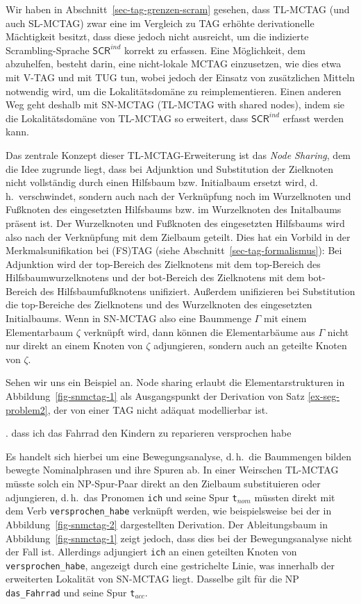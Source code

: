 Wir haben in Abschnitt~\ref{sec-tag-grenzen-scram} gesehen, dass TL-MCTAG (und auch SL-MCTAG) zwar eine im Vergleich zu TAG erhöhte derivationelle Mächtigkeit besitzt, dass diese jedoch nicht ausreicht, um die indizierte Scrambling-Sprache  $\mathsf{SCR}^{ind}$ korrekt zu erfassen. Eine Möglichkeit, dem abzuhelfen, besteht darin, eine nicht-lokale MCTAG einzusetzen, wie dies etwa \cite{Rambow:94} mit V-TAG und \cite{Gerdes:04} mit TUG tun, wobei jedoch der Einsatz von zusätzlichen Mitteln notwendig wird, um die Lokalitätsdomäne zu reimplementieren. Einen anderen Weg geht deshalb \cite{Kallmeyer:05} mit SN-MCTAG (TL-MCTAG with shared nodes), indem sie die Lokalitätsdomäne von TL-MCTAG so erweitert, dass $\mathsf{SCR}^{ind}$ erfasst werden kann. 

Das zentrale Konzept dieser TL-MCTAG-Erweiterung ist das {\it Node Sharing}, dem die Idee zugrunde liegt, dass bei Adjunktion und Substitution der Zielknoten nicht vollständig durch einen Hilfsbaum bzw. Initialbaum ersetzt wird, d.\,h.\ verschwindet, sondern auch nach der Verknüpfung noch im Wurzelknoten und Fu\ss knoten des eingesetzten Hilfsbaums bzw. im Wurzelknoten des Initalbaums präsent ist. Der Wurzelknoten und Fu\ss knoten des eingesetzten Hilfsbaums wird also nach der Verknüpfung mit dem Zielbaum geteilt. Dies hat ein Vorbild in der Merkmalsunifikation bei (FS)TAG (siehe Abschnitt~\ref{sec-tag-formalismus}): Bei Adjunktion wird der {\sc top}-Bereich des Zielknotens mit dem {\sc top}-Bereich des Hilfsbaumwurzelknotens und der {\sc bot}-Bereich des Zielknotens mit dem {\sc bot}-Bereich des Hilfsbaumfu\ss knotens unifiziert. Au\ss erdem unifizieren bei Substitution die {\sc top}-Bereiche des Zielknotens und des Wurzelknoten des eingesetzten Initialbaums. Wenn in SN-MCTAG also eine Baummenge $\Gamma$ mit einem Elementarbaum $\zeta$ verknüpft wird, dann können die Elementarbäume aus $\Gamma$ nicht nur direkt an einem Knoten von $\zeta$ adjungieren, sondern auch an geteilte Knoten von $\zeta$.

Sehen wir uns ein Beispiel an. Node sharing erlaubt die Elementarstrukturen in Abbildung~\ref{fig-snmctag-1} als Ausgangspunkt der Derivation von Satz \ref{ex-seg-problem2}, der von einer TAG nicht adäquat modellierbar ist. 

\ex. dass ich das Fahrrad den Kindern zu reparieren versprochen habe \label{ex-seg-problem2}

Es handelt sich hierbei um eine Bewegungsanalyse, d.\,h.\ die Baummengen bilden bewegte Nominalphrasen und ihre Spuren ab. In einer Weirschen TL-MCTAG müsste solch ein NP-Spur-Paar direkt an den Zielbaum substituieren oder adjungieren, d.\,h.\ das Pronomen {\tt ich} und seine Spur {\tt t}$_{nom}$ müssten direkt mit dem Verb {\tt versprochen\_habe} verknüpft werden, wie beispielsweise bei der in Abbildung~\ref{fig-snmctag-2} dargestellten Derivation. Der Ableitungsbaum in Abbildung~\ref{fig-snmctag-1} zeigt jedoch, dass dies bei der Bewegungsanalyse nicht der Fall ist. Allerdings adjungiert {\tt ich} an einen geteilten Knoten von {\tt versprochen\_habe}, angezeigt durch eine gestrichelte Linie, was innerhalb der erweiterten Lokalität von SN-MCTAG liegt. Dasselbe gilt für die NP {\tt das\_Fahrrad} und seine Spur {\tt t}$_{acc}$.     

